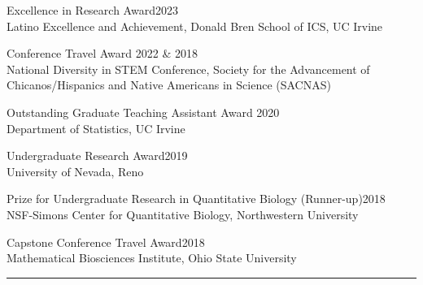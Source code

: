 \documentclass{article}
\begin{document}
	
	\begin{description}
		\vspace{-2mm}
		\item[Awards]\hspace*{.1in}
		
		Excellence in Research Award\hfill{2023}\\
		Latino Excellence and Achievement, Donald Bren School of ICS, UC Irvine
		\vspace*{1mm}
		
		Conference Travel Award \hfill{2022 \& 2018}\\
		National Diversity in STEM Conference, Society for the Advancement of Chicanos/Hispanics and Native Americans in Science (SACNAS)
		\vspace*{1mm}
		
		Outstanding Graduate Teaching Assistant Award \hfill{2020}\\ 
		Department of Statistics, UC Irvine
		\vspace*{1mm}
		
		Undergraduate Research Award\hfill{2019}\\
		University of Nevada, Reno
		\vspace*{1mm}
		
		Prize for Undergraduate Research in Quantitative Biology (Runner-up)\hfill{2018}\\
		NSF-Simons Center for Quantitative Biology, Northwestern University
		\vspace*{1mm}
		
		Capstone Conference Travel Award\hfill{2018}\\
		Mathematical Biosciences Institute, Ohio State University
		
	\end{description}
	\vspace{-2mm}
	\rule{\linewidth}{1pt}
	
	
	
\end{document}
